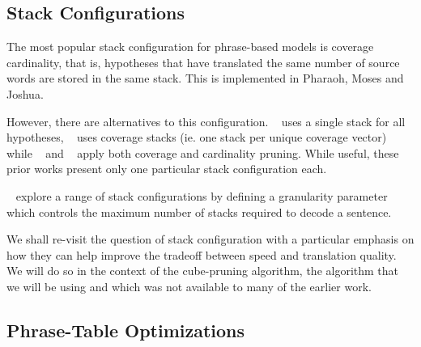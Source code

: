 \documentclass[]{article}
\begin{document}

\subsection{Stack Configurations}

The most popular stack configuration for phrase-based models is coverage cardinality, that is, hypotheses that have translated the same number of source words are stored in the same stack. This is implemented in Pharaoh, Moses and Joshua.


However, there are alternatives to this configuration. ~\cite{Och:2001a} uses a single stack for all hypotheses, ~\cite{Brown:1993} uses coverage stacks (ie. one stack per unique coverage vector) while ~\cite{peitz2012jane} and ~\cite{Zens+Ney:2008:iwslt} apply both coverage and cardinality pruning. While useful, these prior works present only one particular stack configuration each.

~\cite{ortizmartinez-garciavarea-casacuberta:2006:WMT} explore a range of stack configurations by defining a granularity parameter which controls the maximum number of stacks required to decode a sentence. 

We shall re-visit the question of stack configuration with a particular emphasis on how they can help improve the tradeoff between speed and translation quality. We will do so in the context of the cube-pruning algorithm, the algorithm that we will be using and which was not available to many of the earlier work.

\subsection{Phrase-Table Optimizations}
\end{document}
